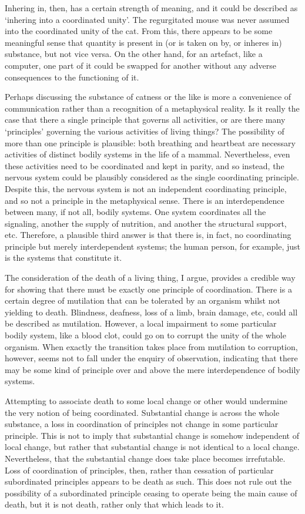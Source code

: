 Inhering in, then, has a certain strength of meaning, and it could be described as `inhering into a coordinated unity'. The regurgitated mouse was never assumed into the coordinated unity of the cat. From this, there appears to be some meaningful sense that quantity is present in (or is taken on by, or inheres in) substance, but not vice versa. On the other hand, for an artefact, like a computer, one part of it could be swapped for another without any adverse consequences to the functioning of it.

Perhaps discussing the substance of catness or the like is more a convenience of communication rather than a recognition of a metaphysical reality. Is it really the case that there a single principle that governs all activities, or are there many `principles' governing the various activities of living things?
The possibility of more than one principle is plausible: both breathing and heartbeat are necessary activities of distinct bodily systems in the life of a mammal. Nevertheless, even these activities need to be coordinated and kept in parity, and so instead, the nervous system could be plausibly considered as the single coordinating principle. Despite this, the nervous system is not an independent coordinating principle, and so not a principle in the metaphysical sense. There is an interdependence between many, if not all, bodily systems. One system coordinates all the signaling, another the supply of nutrition, and another the structural support, etc. Therefore, a plausible third answer is that there is, in fact, no coordinating principle but merely interdependent systems; the human person, for example, just is the systems that constitute it.

The consideration of the death of a living thing, I argue, provides a credible way for showing that there must be exactly one principle of coordination. There is a certain degree of mutilation that can be tolerated by an organism whilst not yielding to death. Blindness, deafness, loss of a limb, brain damage, etc, could all be described as mutilation. However, a local impairment to some particular bodily system, like a blood clot, could go on to corrupt the unity of the whole organism. When exactly the transition takes place from mutilation to corruption, however, seems not to fall under the enquiry of observation, indicating that there may be some kind of principle over and above the mere interdependence of bodily systems.

Attempting to associate death to some local change or other would undermine the very notion of being coordinated. Substantial change is across the whole substance, a loss in coordination of principles not change in some particular principle. This is not to imply that substantial change is somehow independent of local change, but rather that substantial change is not identical to a local change. Nevertheless, that the substantial change does take place becomes irrefutable. Loss of coordination of principles, then, rather than cessation of particular subordinated principles appears to be death as such. This does not rule out the possibility of a subordinated principle ceasing to operate being the main cause of death, but it is not death, rather only that which leads to it.

